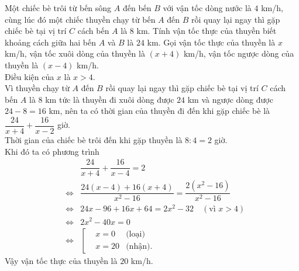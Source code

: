 \begin{ex}%
	Một chiếc bè trôi từ bến sông $A$ đến bến $B$ với vận tốc dòng nước là $4$ km/h, cùng lúc đó một chiếc thuyền chạy từ bến $A$ đến $B$ rồi quay lại ngay thì gặp chiếc bè tại vị trí $C$ cách bến $A$ là $8$ km. Tính vận tốc thực của thuyền biết khoảng cách giữa hai bến $A$ và $B$ là $24$ km.
	\loigiai
	{
		Gọi vận tốc thực của thuyền là $x$ km/h, vận tốc xuôi dòng của thuyền là $(x+4)$ km/h, vận tốc ngược dòng của thuyền là $(x-4)$ km/h.\\
		Điều kiện của $x$ là $x>4$.\\
		Vì thuyền chạy từ $A$ đến $B$ rồi quay lại ngay thì gặp chiếc bè tại vị trí $C$ cách bến $A$ là $8$ km tức là thuyền đi xuôi dòng được $24$ km và ngược dòng được $24-8=16$ km, nên ta có thời gian của thuyền đi đến khi gặp chiếc bè là $\dfrac{24}{x+4}+\dfrac{16}{x-2}$ giờ.\\
		Thời gian của chiếc bè trôi đến khi gặp thuyền là $8:4=2$ giờ.\\
		Khi đó ta có phương trình
		\allowdisplaybreaks
		\begin{eqnarray*}
		 && \dfrac{24}{x+4}+\dfrac{16}{x-4}=2\\
		 &\Leftrightarrow & \dfrac{24(x-4)+16(x+4)}{x^2-16} = \dfrac{2(x^2-16)}{x^2-16}\\
		 &\Leftrightarrow & 24x-96+16x+64=2x^2-32 \quad(\text{vì } x>4)\\
		 &\Leftrightarrow & 2x^2-40x=0\\
		 &\Leftrightarrow & \left[\begin{aligned}&x=0 &\text{(loại)} \\&x=20 &\text{(nhận).} \end{aligned} \right.
		\end{eqnarray*}
		Vậy vận tốc thực của thuyền là $20$ km/h.
	}
\end{ex}


